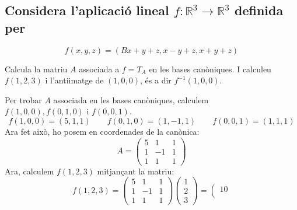 \documentclass[a4paper, 12pt]{article}
\begin{document}
    \subsection{Considera l'aplicació lineal $f: \mathbb{R}^3 \rightarrow \mathbb{R}^3$ definida per}
    \begin{displaymath}
        f(x,y,z) = (Bx+y+z, x-y+z, x+y+z)
    \end{displaymath}
    \begin{exercici}
        Calcula la matriu $A$ associada a $f = T_A$ en les bases canòniques. I calculeu $f(1,2,3)$ i l'antiimatge de $(1,0,0)$, és a dir $f^{-1}(1,0,0)$.
    \end{exercici}
    \begin{solucio}
        Per trobar $A$ associada en les bases canòniques, calculem $f(1, 0, 0), f(0, 1, 0)\text{ i }f(0, 0, 1)$.
        \begin{displaymath}
            f(1, 0, 0) = (5, 1, 1)\qquad f(0, 1, 0) = (1, -1, 1)\qquad f(0, 0, 1) = (1, 1, 1)
        \end{displaymath}
        Ara fet això, ho posem en coordenades de la canònica:
        \begin{displaymath}
            A = \left(
                \begin{array}{ccc}
                    5 & 1 & 1\\
                    1 & -1 & 1\\
                    1 & 1 & 1
                \end{array}
            \right)
        \end{displaymath}
        Ara, calculem $f(1, 2, 3)$ mitjançant la matriu:
        \begin{displaymath}
            f(1, 2, 3) = \left(
                \begin{array}{ccc}
                    5 & 1 & 1\\
                    1 & -1 & 1\\
                    1 & 1 & 1
                \end{array}
            \right)
            \left(
                \begin{array}{ccc}
                    1\\
                    2\\
                    3
                \end{array}
            \right)
            =
            \left(
                \begin{array}{ccc}
                    10\\

\end{array}
\end{displaymath}
\end{solucio}
\end{document}
